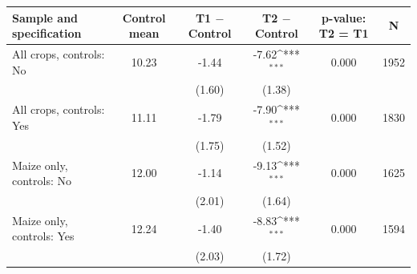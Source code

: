 {
\def\sym#1{\ifmmode^{#1}\else\(^{#1}\)\fi}
\begin{tabular}{lccccc}
\hline\hline
Sample and specification & Control mean & T1 $-$ Control & T2 $-$ Control & p-value: T2 = T1 & N \\
\hline
All crops, controls: No & 10.23 & -1.44 & -7.62\sym{***} & 0.000 & 1952 \\
& & (1.60) & (1.38) & & \\
All crops, controls: Yes & 11.11 & -1.79 & -7.90\sym{***} & 0.000 & 1830 \\
& & (1.75) & (1.52) & & \\
Maize only, controls: No & 12.00 & -1.14 & -9.13\sym{***} & 0.000 & 1625 \\
& & (2.01) & (1.64) & & \\
Maize only, controls: Yes & 12.24 & -1.40 & -8.83\sym{***} & 0.000 & 1594 \\
& & (2.03) & (1.72) & & \\
\hline\hline
\end{tabular}
}
